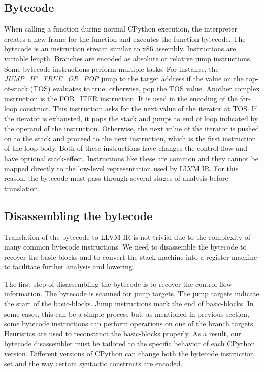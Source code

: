 \documentclass{acm_proc_article-sp}
\begin{document}
\subsection{Bytecode}

When calling a function during normal CPython execution, the
interpreter creates a new frame for the function and executes the
function bytecode.  The bytecode is an instruction stream similar to
x86 assembly.  Instructions are variable length. Branches are encoded
as absolute or relative jump instructions. Some bytecode instructions
perform multiple tasks.  For instance, the
\textit{JUMP\_IF\_TRUE\_OR\_POP} jump to the target address if the
value on the top-of-stack (TOS) evaluates to true; otherwise, pop the
TOS value.  Another complex instruction is the FOR\_ITER instruction.
It is used in the encoding of the for-loop construct.  This
instruction asks for the next value of the iterator at TOS.  If the
iterator is exhausted, it pops the stack and jumps to end of loop
indicated by the operand of the instruction.  Otherwise, the next
value of the iterator is pushed on to the stack and proceed to the
next instruction, which is the first instruction of the loop
body. Both of these instructions have changes the control-flow and
have optional stack-effect. \cite{pythondoc:dis} Instructions like
these are common and they cannot be mapped directly to the low-level
representation used by LLVM IR.  For this reason, the bytecode must
pass through several stages of analysis before translation.

\subsection{Disassembling the bytecode}

Translation of the bytecode to LLVM IR is not trivial due to the
complexity of many common bytecode instructions.  We need to disassemble
the bytecode to recover the basic-blocks and to convert the stack machine into
a register machine to facilitate further analysis and lowering.

The first step of disassembling the bytecode is to recover the control
flow information. The bytecode is scanned for jump targets. The jump
targets indicate the start of the basic-blocks.  Jump instructions
mark the end of basic-blocks. In some cases, this can be a simple
process but, as mentioned in previous section, some bytecode
instructions can perform operations on one of the branch targets.
Heuristics are used to reconstruct the basic-blocks properly. As a
result, our bytecode disassembler must be tailored to the specific
behavior of each CPython version.  Different versions of CPython can
change both the bytecode instruction set and the way certain syntactic
constructs are encoded.
\end{document}
